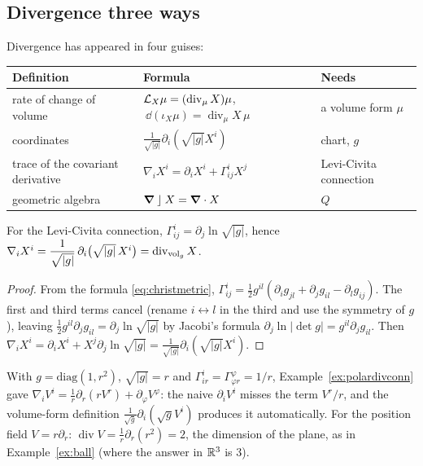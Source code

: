 \subsection{Divergence three ways}\label{sec:divthree}

Divergence has appeared in four guises:
\begin{center}
\small
\begin{tabular}{@{}p{4.1cm}p{5.4cm}p{4.6cm}@{}}
\toprule
\textbf{Definition} & \textbf{Formula} & \textbf{Needs}\\
\midrule
rate of change of volume & $\mathcal{L}_X\mu=(\operatorname{div}_\mu X)\mu$, $\ \dd(\iota_X\mu)=\operatorname{div}_\mu X\,\mu$ & a volume form $\mu$\\
coordinates & $\frac1{\sqrt{|g|}}\partial_i(\sqrt{|g|}X^i)$ & chart, $g$\\
trace of the covariant derivative & $\nabla_iX^i=\partial_iX^i+\Gamma^i_{ij}X^j$ & Levi-Civita connection\\
geometric algebra & $\boldsymbol{\nabla}\mathbin{\rfloor} X=\boldsymbol{\nabla}\cdot X$ & $Q$\\
\bottomrule
\end{tabular}
\end{center}

\begin{proposition}\label{prop:divagree}
For the Levi-Civita connection, $\Gamma^i_{ij}=\partial_j\ln\sqrt{|g|}$, hence $\nabla_iX^i=\dfrac1{\sqrt{|g|}}\,\partial_i\bigl(\sqrt{|g|}\,X^i\bigr)=\operatorname{div}_{\mathrm{vol}_g}X$.
\end{proposition}
\begin{proof}
From the formula \eqref{eq:christmetric}, $\Gamma^i_{ij}=\frac12g^{il}(\partial_ig_{jl}+\partial_jg_{il}-\partial_lg_{ij})$. The first and third terms cancel (rename $i\leftrightarrow l$ in the third and use the symmetry of $g$), leaving $\frac12g^{il}\partial_jg_{il}=\partial_j\ln\sqrt{|g|}$ by Jacobi's formula $\partial_j\ln|\det g|=g^{il}\partial_jg_{il}$. Then $\nabla_iX^i=\partial_iX^i+X^j\partial_j\ln\sqrt{|g|}=\frac1{\sqrt{|g|}}\partial_i(\sqrt{|g|}X^i)$.
\end{proof}

\begin{example}\label{ex:polardiv}
With $g=\mathrm{diag}(1,r^2)$, $\sqrt{|g|}=r$ and $\Gamma^i_{ir}=\Gamma^\varphi_{\varphi r}=1/r$, Example~\ref{ex:polardivconn} gave $\nabla_iV^i=\frac1r\partial_r(rV^r)+\partial_\varphi V^\varphi$: the naive $\partial_iV^i$ misses the term $V^r/r$, and the volume-form definition $\frac1{\sqrt g}\partial_i(\sqrt gV^i)$ produces it automatically. For the position field $V=r\partial_r$: $\operatorname{div}V=\frac1r\partial_r(r^2)=2$, the dimension of the plane, as in Example~\ref{ex:ball} (where the answer in $\mathbb{R}^3$ is $3$).
\end{example}
